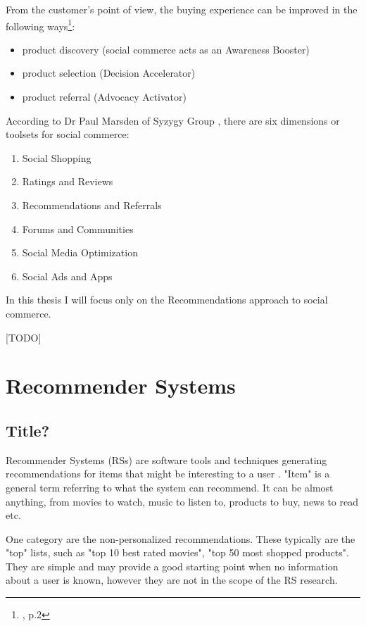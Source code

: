 \documentclass[12pt]{report}
\begin{document}
From the customer's point of view, the buying experience can be improved in the following ways\footnote{\cite{social_commerce_syzygy}, p.2}:
\begin{itemize}
\item product discovery (social commerce acts as an Awareness Booster)
\item product selection (Decision Accelerator)
\item product referral (Advocacy Activator)
\end{itemize}

According to Dr Paul Marsden of Syzygy Group \cite{social_commerce_syzygy}, there are six dimensions or toolsets for social commerce:
\begin{enumerate}
\item Social Shopping
\item Ratings and Reviews
\item Recommendations and Referrals
\item Forums and Communities
\item Social Media Optimization
\item Social Ads and Apps
\end{enumerate}

In this thesis I will focus only on the Recommendations approach to social commerce.

[TODO]

\section{Recommender Systems}

\subsection{Title?}

Recommender Systems (RSs) are software tools and techniques generating recommendations for items that might be interesting to a user \cite{rec_sys_handbook}. "Item" is a general term referring to what the system can recommend. It can be almost anything, from movies to watch, music to listen to, products to buy, news to read etc.

One category are the non-personalized recommendations. These typically are the "top" lists, such as "top 10 best rated movies", "top 50 most shopped products". They are simple and may provide a good starting point when no information about a user is known, however they are not in the scope of the RS research.
\end{document}
